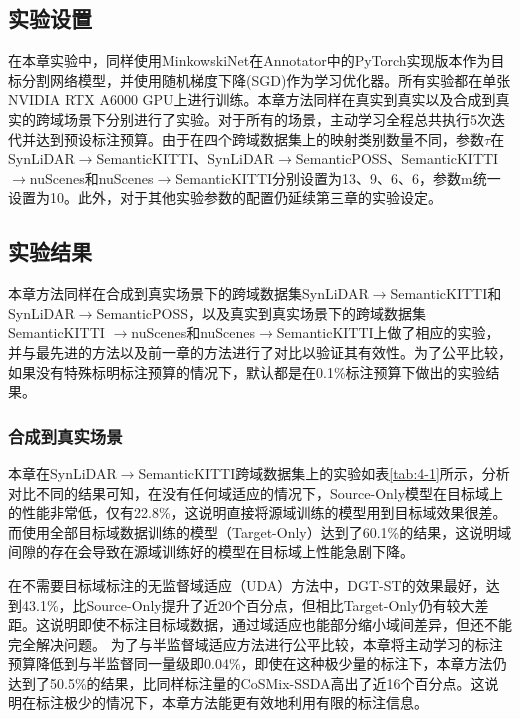     \subsection{实验设置}
    在本章实验中，同样使用MinkowskiNet在Annotator中的PyTorch实现版本作为目标分割网络模型，并使用随机梯度下降(SGD)作为学习优化器。所有实验都在单张NVIDIA RTX A6000 GPU上进行训练。本章方法同样在真实到真实以及合成到真实的跨域场景下分别进行了实验。对于所有的场景，主动学习全程总共执行5次迭代并达到预设标注预算。由于在四个跨域数据集上的映射类别数量不同，参数$\tau$在SynLiDAR$\to$SemanticKITTI、SynLiDAR$\to$SemanticPOSS、SemanticKITTI$\to$nuScenes和nuScenes$\to$SemanticKITTI分别设置为13、9、6、6，参数m统一设置为10。此外，对于其他实验参数的配置仍延续第三章的实验设定。
    \subsection{实验结果}
    本章方法同样在合成到真实场景下的跨域数据集SynLiDAR$\to$SemanticKITTI和SynLiDAR$\to$SemanticPOSS，以及真实到真实场景下的跨域数据集SemanticKITTI
    $\to$nuScenes和nuScenes$\to$SemanticKITTI上做了相应的实验，并与最先进的方法以及前一章的方法进行了对比以验证其有效性。为了公平比较，如果没有特殊标明标注预算的情况下，默认都是在0.1\%标注预算下做出的实验结果。
    \subsubsection{合成到真实场景}
    
    本章在SynLiDAR$\to$SemanticKITTI跨域数据集上的实验如表\ref{tab:4-1}所示，分析对比不同的结果可知，在没有任何域适应的情况下，Source-Only模型在目标域上的性能非常低，仅有22.8\%，这说明直接将源域训练的模型用到目标域效果很差。而使用全部目标域数据训练的模型（Target-Only）达到了60.1\%的结果，这说明域间隙的存在会导致在源域训练好的模型在目标域上性能急剧下降。

    在不需要目标域标注的无监督域适应（UDA）方法中，DGT-ST的效果最好，达到43.1\%，比Source-Only提升了近20个百分点，但相比Target-Only仍有较大差距。这说明即使不标注目标域数据，通过域适应也能部分缩小域间差异，但还不能完全解决问题。
    为了与半监督域适应方法进行公平比较，本章将主动学习的标注预算降低到与半监督同一量级即0.04\%，即使在这种极少量的标注下，本章方法仍达到了50.5\%的结果，比同样标注量的CoSMix-SSDA高出了近16个百分点。这说明在标注极少的情况下，本章方法能更有效地利用有限的标注信息。

